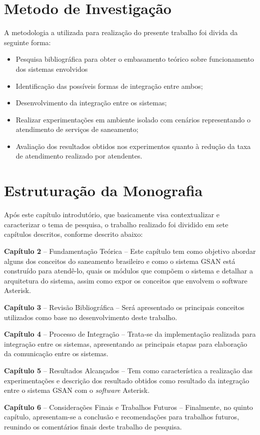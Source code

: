 \section*{Metodo de Investigação}
A metodologia a utilizada para realização do presente trabalho foi divida da seguinte forma:
\begin{itemize}
	\item Pesquisa bibliográfica para obter o embasamento teórico sobre funcionamento dos sistemas envolvidos
	\item Identificação das possíveis formas de integração entre ambos;
	\item Desenvolvimento da integração entre os sistemas;
	\item Realizar experimentações em ambiente isolado com cenários representando o atendimento de serviços de saneamento; 
	\item Avaliação dos resultados obtidos nos experimentos quanto à redução da taxa de atendimento realizado por atendentes.
\end{itemize}

\section*{Estruturação da Monografia}
	
Após este capítulo introdutório, que basicamente visa contextualizar e caracterizar o tema de pesquisa, o trabalho realizado foi dividido em sete capítulos descritos, conforme descrito abaixo:
\begin{description}
	\item \textbf{Capítulo 2} – Fundamentação Teórica – Este capítulo tem como objetivo abordar alguns dos conceitos do saneamento brasileiro e como o sistema GSAN está construído para atendê-lo, quais os módulos que compõem o sistema e detalhar a arquitetura do sistema, assim como expor os conceitos que envolvem o software Asterisk.
	\item \textbf{Capítulo 3 } – Revisão Bibliográfica – Será apresentado os principais conceitos utilizados como base no desenvolvimento deste trabalho.
	\item \textbf{Capítulo  4} – Processo de Integração – Trata-se da implementação realizada para integração entre os sistemas, apresentando as principais etapas para elaboração da comunicação entre os sistemas.
	\item \textbf{Capítulo  5} – Resultados Alcançados – Tem como característica a realização das experimentações e descrição dos resultado obtidos como resultado da integração entre o sistema GSAN com o \textit{software} Asterisk.
	\item \textbf{Capítulo 6} – Considerações Finais e Trabalhos Futuros – Finalmente, no quinto capítulo, apresentam-se a conclusão e recomendações para trabalhos futuros, reunindo os comentários finais deste trabalho de pesquisa.	
\end{description}
	





